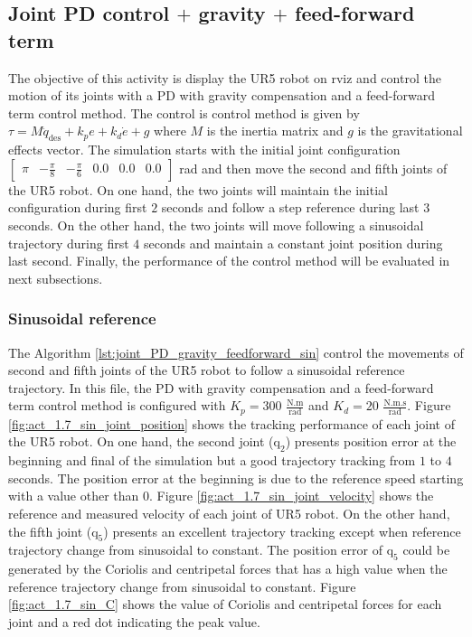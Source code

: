 \subsection{Joint PD control $+$ gravity $+$ feed-forward term}
The objective of this activity is display the UR5 robot on rviz and control the motion of its joints with a PD with gravity compensation and a feed-forward term control method. The control is control method is given by $ \tau = M \ddot{q}_{\mathrm{des}} + k_p e + k_d \dot{e} + g$ where $M$ is the inertia matrix and $g$ is the gravitational effects vector. The simulation starts with the initial joint configuration $\begin{bmatrix} \pi & -\frac{\pi}{8} & -\frac{\pi}{6} & 0.0 & 0.0 & 0.0 \end{bmatrix}$ rad and then move the second and fifth joints of the UR5 robot. On one hand, the two joints will maintain the initial configuration during first $2$ seconds and follow a step reference during last $3$ seconds. On the other hand, the two joints will move following a sinusoidal trajectory during first $4$ seconds and maintain a constant joint position during last second. Finally, the performance of the control method will be evaluated in next subsections.

\subsubsection{Sinusoidal reference}
The Algorithm \ref{lst:joint_PD_gravity_feedforward_sin} control the movements of second and fifth joints of the UR5 robot to follow a sinusoidal reference trajectory. In this file, the PD with gravity compensation and a feed-forward term control method is configured with $K_p=300$ $\mathrm{\frac{N.m}{rad}}$ and $K_d=20$ $\mathrm{\frac{N.m.s}{rad}}$. Figure \ref{fig:act_1.7_sin_joint_position} shows the tracking performance of each joint of the UR5 robot. On one hand, the second joint ($\mathrm{q}_2$) presents position error at the beginning and final of the simulation but a good trajectory tracking from $1$ to $4$ seconds. The position error at the beginning is due to the reference speed starting with a value other than 0. Figure \ref{fig:act_1.7_sin_joint_velocity} shows the reference and measured velocity of each joint of UR5 robot. On the other hand, the fifth joint ($\mathrm{q}_5$) presents an excellent trajectory tracking except when reference trajectory change from sinusoidal to constant. The position error of $\mathrm{q}_5$ could be generated by the Coriolis and centripetal forces that has a high value when the reference trajectory change from sinusoidal to constant. Figure \ref{fig:act_1.7_sin_C} shows the value of Coriolis and centripetal forces for each joint and a red dot indicating the peak value.

